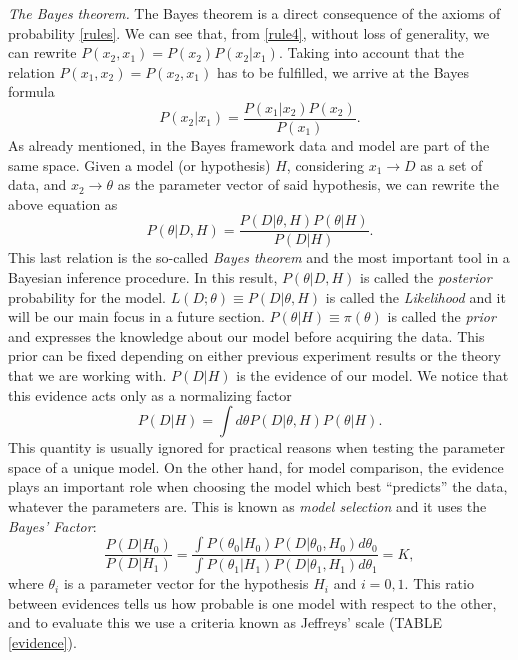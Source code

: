 \documentclass[onecolumn,           %
               showpacs,            %
               preprintnumbers,     %
               aps,                 %
               letterpaper,             %
               superscriptaddress,      %
               nofootinbib,         %
               tightenlines,        %
               floats,floatfix      %
               ,usenatbib,
               ]{revtex4-1}
\begin{document}
\textit{The Bayes theorem.} The Bayes theorem is a direct consequence of the axioms of probability \eqref{rules}. We can see that, from \eqref{rule4}, without loss of generality, we can rewrite $P(x_2,x_1)=P(x_2)P(x_2|x_1)$. Taking into account that the relation $P(x_1,x_2)=P(x_2,x_1)$ has to be fulfilled, we arrive at the Bayes formula   
\begin{equation}
P(x_2|x_1)=\frac{P(x_1|x_2)P(x_2)}{P(x_1)}.
\end{equation}
As already mentioned, in the Bayes framework data and model are part of the same space. Given a model (or hypothesis) $H$, considering $x_1\rightarrow D$ as a set of data, and $x_2\rightarrow \theta$ as the parameter vector of said hypothesis, we can rewrite the above equation as
\begin{equation}\label{BayesT}
P(\theta|D, H)=\frac{P(D|\theta,H)P(\theta|H)}{P(D|H)}.
\end{equation}
This last relation is the so-called \textit{Bayes theorem} and the most important tool in a Bayesian inference procedure. In this result, $P(\theta|D, H)$ is called the \textit{posterior} probability for the model. $L(D;\theta)\equiv P(D|\theta,H)$ is called the \textit{Likelihood} and it will be our main focus in a future section. $P(\theta|H)\equiv \pi(\theta)$ is called the \textit{prior} and expresses the knowledge about our model before acquiring the data. This prior can be fixed depending on either previous experiment results or the theory that we are working with. $P(D|H)$ is the evidence of our model. We notice that this evidence acts only as a normalizing factor
\begin{equation}\label{PD}
P(D|H)=\int d\theta P(D|\theta,H)P(\theta|H).
\end{equation}
This quantity is usually ignored for practical reasons when testing the parameter space of a unique model. On the other hand, for model comparison, the evidence plays an important role when choosing the model which best ``predicts'' the data, whatever the parameters are. This is known as \textit{model selection} and it uses the \textit{Bayes' Factor}:
\begin{equation}\label{bayesfactor}
\frac{P(D\vert H_0)}{P(D\vert H_1)}= \frac{\int P(\theta_0\vert H_0)P(D\vert\theta_0, H_0)d\theta_0}{\int P(\theta_1\vert H_1)P(D\vert\theta_1, H_1)d\theta_1}=K,
\end{equation}
where $\theta_i$ is a parameter vector for the hypothesis $H_i$ and $i=0,1$. This ratio between evidences tells us how probable is one model with respect to the other, and to evaluate this we use a criteria known as Jeffreys' scale (TABLE \ref{evidence}). 
\end{document}
